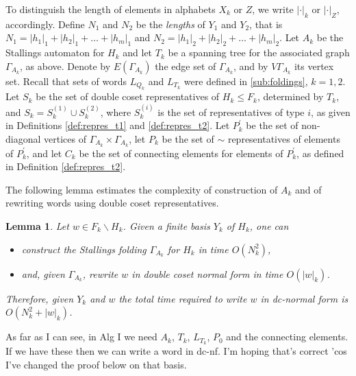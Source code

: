 \documentclass[a4paper,12pt]{article}
\newcommand{\G}{\Gamma }
\newtheorem{lemma}[theorem]{Lemma}
\numberwithin{equation}{section}
\numberwithin{figure}{section}
\begin{document}
To distinguish the length of elements in alphabets $X_k$ or
$Z$, we write $|\cdot|_k$ or $|\cdot|_Z$, accordingly. Define  $N_1$ and $N_2$
be the \emph{lengths} of $Y_1$ and $Y_2$, that is
$N_1 = |h_1|_1 + |h_2|_1 + \ldots + |h_m|_1$ and $N_2 = |h_1|_2 +
|h_2|_2 + \ldots + |h_m|_2$. Let $A_k$ be the Stallings automaton
for $H_k$ and let $T_k$ be a spanning tree for the associated
graph $\G_{A_k}$, as above. Denote by $E(\G_{A_k})$ the  edge set
of $\G_{A_k}$, and by $V\G_{A_k}$  its vertex set.
Recall that sets of words  $L_{Q_k}$ and $L_{T_k}$
were defined in \ref{sub:foldings}, $k=1,2$. Let $S_k$ be the set of
double coset representatives of $H_k\le F_k$, determined by $T_k$, and
 $S_k=S_k^{(1)}\cup S_k^{(2)}$, where $S_k^{(i)}$ is the set
of representatives of type $i$, as given in Definitions \ref{def:repres_t1}
and \ref{def:repres_t2}.  Let $P_k^\prime$ be the set of non-diagonal
vertices of $\G_{A_k}\times \G_{A_k}$, let $P_k$ be the set of
$\sim$ representatives of elements of $P_k^\prime$, and let $C_k$ be
the set of connecting elements for elements of $P_k^\prime$, as defined in
Definition \ref{def:repres_t2}.


The following lemma estimates the complexity of
construction of $A_k$ and of rewriting words using
double coset representatives.
\begin{lemma}\label{lem:dctransversal} Let $w \in F_k \smallsetminus H_k$. Given a finite basis $Y_k$ of $H_k$, one can
\begin{itemize}
\item construct the Stallings folding $\G_{A_k}$ for $H_k$ in time $O(N_k^2)$,
\item and, given $\G_{A_k}$,
rewrite $w$ in  double coset normal
form in time  $O(|w|_k)$.
\end{itemize}
Therefore, given $Y_k$ and $w$ the total time required to write $w$ in dc-normal
 form is  $O(N_k^2 + |w|_k)$.
\end{lemma}

{\ajd As far as I can see, in Alg I we need $A_k$, $T_k$, $L_{T_k}$, $P_0$ and the connecting elements. If
 we have these then we can write a word in dc-nf. I'm hoping that's correct
'cos I've changed the proof below on that basis.}
\end{document}

